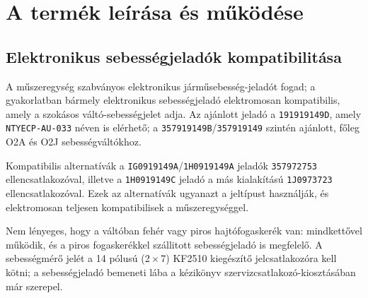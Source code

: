\chapter{A term\'ek le\'ir\'asa \'es m\H{u}k\"od\'ese}\label{ch:description}

\section{Elektronikus sebess\'egjelad\'ok kompatibilit\'asa}
A m\H{u}szeregys\'eg szabv\'anyos elektronikus j\'arm\H{u}sebess\'eg-jelad\'ot fogad; a gyakorlatban b\'armely elektronikus sebess\'egjelad\'o elektromosan kompatibilis, amely a szok\'asos v\'alt\'o-sebess\'egjelet adja.
Az aj\'anlott jelad\'o a \texttt{191919149D}, amely \texttt{NTYECP-AU-033} n\'even is el\'erhet\H{o}; a \texttt{357919149B}/\texttt{357919149} szint\'en aj\'anlott, f\H{o}leg O2A \'es O2J sebess\'egv\'alt\'okhoz.

Kompatibilis alternat\'iv\'ak a \texttt{IG0919149A}/\texttt{1H0919149A} jelad\'ok \texttt{357972753} ellencsatlakoz\'oval, illetve a \texttt{1H0919149C} jelad\'o a m\'as kialak\'it\'as\'u \texttt{1J0973723} ellencsatlakoz\'oval.
Ezek az alternat\'iv\'ak ugyanazt a jelt\'ipust haszn\'alj\'ak, \'es elektromosan teljesen kompatibilisek a m\H{u}szeregys\'eggel.

Nem l\'enyeges, hogy a v\'alt\'oban feh\'er vagy piros hajt\'ofogasker\'ek van: mindkett\H{o}vel m\H{u}k\"odik, \'es a piros fogasker\'ekkel sz\'allitott sebess\'egjelad\'o is megfelel\H{o}.
A sebess\'egm\'er\H{o} jel\'et a 14 p\'olus\'u (2\,$\times$\,7) KF2510 kieg\'esz\'it\H{o} jelcsatlakoz\'ora kell k\"otni; a sebess\'egjelad\'o bemeneti l\'aba a k\'ezik\"onyv szervizcsatlakoz\'o-kioszt\'as\'aban m\'ar szerepel.
